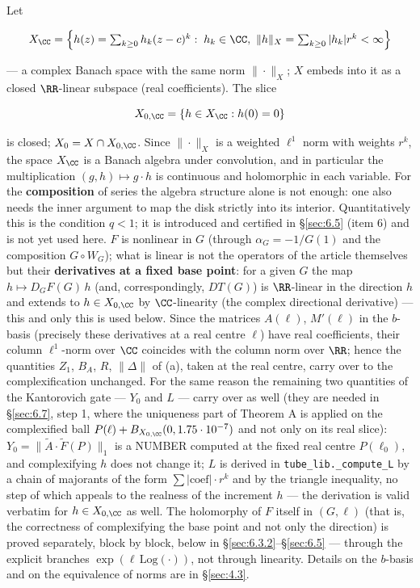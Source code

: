 Let

\[
X_{\CC}=\Bigl\{h(z)=\textstyle\sum_{k\ge0}h_k(z-c)^k:\;h_k\in\CC,\
\|h\|_X=\sum_{k\ge0}|h_k|r^k<\infty\Bigr\}
\]

--- a complex Banach space with the same norm $\|\cdot\|_X$; $X$ embeds into it
as a closed $\RR$-linear subspace (real coefficients). The slice

\[
X_{0,\CC}=\{h\in X_{\CC}:h(0)=0\}
\]

is closed; $X_0=X\cap X_{0,\CC}$. Since $\|\cdot\|_X$ is a weighted
$\ell^1$ norm with weights $r^k$, the space $X_{\CC}$ is a Banach
algebra under convolution, and in particular the multiplication
$(g,h)\mapsto g\cdot h$ is continuous and holomorphic in each variable. For
the \textbf{composition} of series the algebra structure alone is not enough:
one also needs the inner argument to map the disk strictly into its interior.
Quantitatively this is the condition $q<1$; it is introduced and certified in
\S\ref{sec:6.5} (item 6) and is not yet used here.
$F$ is nonlinear in $G$ (through $\alpha_G=-1/G(1)$ and the composition
$G\circ W_G$); what is linear is not the operators of the article themselves
but their \textbf{derivatives at a fixed base point}: for a given $G$ the map
$h\mapsto D_GF(G)\,h$ (and, correspondingly, $DT(G)$) is $\RR$-linear in
the direction $h$ and extends to $h\in X_{0,\CC}$ by
$\CC$-linearity (the complex directional derivative) --- this and only
this is used below. Since the matrices $A(\ell)$, $M'(\ell)$ in the
$b$-basis (precisely these derivatives at a real centre $\ell$) have real
coefficients, their column $\ell^1$-norm over $\CC$ coincides with the
column norm over $\RR$; hence the quantities $Z_1$, $B_A$, $R$,
$\|\Delta\|$ of (a), taken at the real centre, carry over to the
complexification unchanged. For the same reason the remaining two quantities
of the Kantorovich gate --- $Y_0$ and $L$ --- carry over as well (they are
needed in \S\ref{sec:6.7}, step 1, where the uniqueness part of Theorem A is applied on
the complexified ball $P(\ell)+B_{X_{0,\CC}}(0,1.75\cdot10^{-7})$ and not
only on its real slice): $Y_0=\|\tilde A\cdot\tilde F(P)\|_1$ is a NUMBER
computed at the fixed real centre $P(\ell_0)$, and complexifying $h$ does not
change it; $L$ is derived in \texttt{tube\_\allowbreak lib.\_\allowbreak compute\_\allowbreak L} by a chain of
majorants of the form $\sum|\text{coef}|\cdot r^k$ and by the triangle
inequality, no step of which appeals to the realness of the increment $h$ ---
the derivation is valid verbatim for $h\in X_{0,\CC}$ as well. The
holomorphy of $F$ itself in $(G,\ell)$ (that is, the correctness of
complexifying the base point and not only the direction) is proved
separately, block by block, below in \S\ref{sec:6.3.2}--\S\ref{sec:6.5} --- through the explicit
branches $\exp(\ell\,\mathrm{Log}(\cdot))$, not through linearity. Details on
the $b$-basis and on the equivalence of norms are in \S\ref{sec:4.3}.

